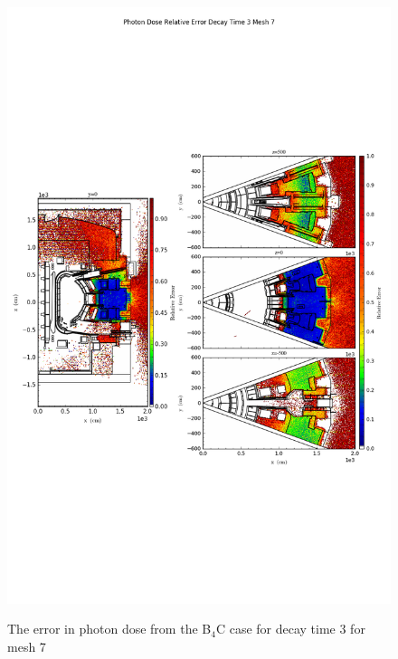 \begin{figure}[ht!]
\centering
\includegraphics[trim={0cm 9cm 0cm 10cm},clip,scale=0.75]{../plots/final_model_with_b4c/Photon_Dose_Relative_Error_Decay_Time_3_Mesh_7.png}
\label{fig:photons_dc3_no4bc_m7_error}
\caption{The error in photon dose from the B$_4$C case for decay time 3 for mesh 7}
\end{figure}
